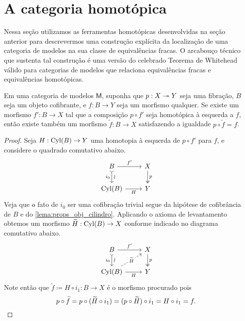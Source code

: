 \section{A categoria homotópica}

Nessa seção utilizamos as ferramentas homotópicas desenvolvidas na seção anterior para descrevermos uma construção explícita da localização de uma categoria de modelos na sua classe de equivalências fracas.
O arcabouço técnico que sustenta tal construção é uma versão do celebrado Teorema de Whitehead válido para categorias de modelos que relaciona equivalências fracas e equivalências homotópicas.

\begin{lema}
  Em uma categoria de modelos $\mathsf{M}$, suponha que $p: X \twoheadrightarrow Y$ seja uma fibração, $B$ seja um objeto cofibrante, e $f: B \to Y$ seja um morfismo qualquer.
  Se existe um morfismo $f': B \to X$ tal que a composição $p \circ f'$ seja homotópica à esquerda a $f$, então existe também um morfismo $\widetilde{f}: B \to X$ satisfazendo a igualdade $p \circ \widetilde{f} = f$.
\end{lema}

\begin{proof}
  Seja $H: \mathrm{Cyl}(B) \to Y$ uma homotopia à esquerda de $p \circ f'$ para $f$, e considere o quadrado comutativo abaixo.
  \begin{displaymath}
    \begin{tikzcd}
      B
      \arrow[d, tail, "\sim" {sloped}, "i_{0}" {swap}]
      \arrow[r, "f'"]
      & X
      \arrow[d, two heads, "p"]
      \\ \Cyl(B)
      \arrow[r, "H" swap]
      & Y
    \end{tikzcd}
  \end{displaymath}
  Veja que o fato de $i_{0}$ ser uma cofibração trivial segue da hipótese de cofibrância de $B$ e do \cref{lema:props_obj_cilindro}.
  Aplicando o axioma de levantamento obtemos um morfismo $\widetilde{H}: \mathrm{Cyl}(B) \to X$ conforme indicado no diagrama comutativo abaixo.
  \begin{displaymath}
    \begin{tikzcd}
      B
      \arrow[d, tail, "\sim" {sloped}, "i_{0}" {swap}]
      \arrow[r, "f'"]
      & X
      \arrow[d, two heads, "p"]
      \\ \Cyl(B)
      \arrow[r, "H" swap]
      \arrow[ru, dashed, "\widetilde{H}" description]
      & Y
    \end{tikzcd}
  \end{displaymath}
  Note então que $\widetilde{f} \coloneqq H \circ i_{1}: B \to X$ é o morfismo procurado pois
  \begin{displaymath}
    p \circ \widetilde{f} = p \circ (\widetilde{H} \circ i_{1}) = (p \circ \widetilde{H}) \circ i_{1} = H \circ i_{1} = f. \qedhere
  \end{displaymath}
\end{proof}

